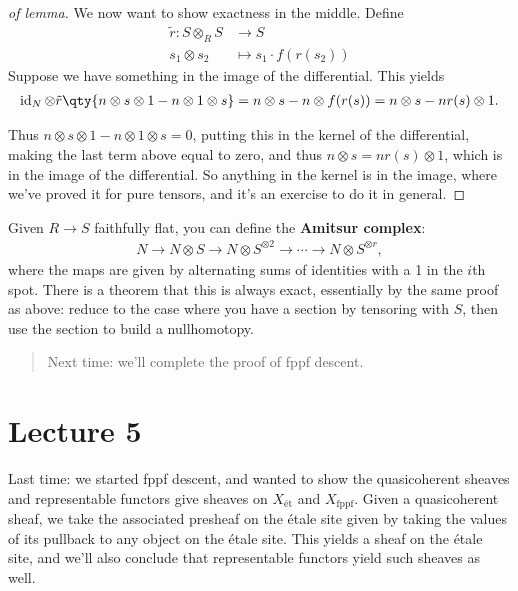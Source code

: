 \begin{proof}[of lemma]
We now want to show exactness in the middle. Define
\begin{align*}
\tilde r: S\otimes_R S &\to S \\
s_1 \otimes s_2 &\mapsto s_1 \cdot f(r(s_2))
\end{align*}
Suppose we have something in the image of the differential. This yields
\begin{align*}  
\operatorname{id}_N \otimes\tilde r \qty{n\otimes s\otimes 1 - n\otimes 1 \otimes s}
= n\otimes s - n\otimes f(r(s))
= n\otimes s - nr(s) \otimes 1
.\end{align*}

Thus \(n\otimes s\otimes 1 - n\otimes 1\otimes s = 0\), putting this in
the kernel of the differential, making the last term above equal to
zero, and thus \(n\otimes s = n r(s) \otimes 1\), which is in the image
of the differential. So anything in the kernel is in the image, where
we've proved it for pure tensors, and it's an exercise to do it in
general.

\end{proof}

\begin{remark}

Given \(R\to S\) faithfully flat, you can define the \textbf{Amitsur
complex}:
\begin{align*}  
N \to N\otimes S \to N\otimes S^{\otimes 2} \to \cdots \to N\otimes S^{\otimes r}
,\end{align*}
where the maps are given by alternating sums of identities with a 1 in
the \(i\)th spot. There is a theorem that this is always exact,
essentially by the same proof as above: reduce to the case where you
have a section by tensoring with \(S\), then use the section to build a
nullhomotopy.

\end{remark}

\begin{quote}
Next time: we'll complete the proof of fppf descent.
\end{quote}

\hypertarget{lecture-5}{%
\section{Lecture 5}\label{lecture-5}}

Last time: we started fppf descent, and wanted to show the quasicoherent
sheaves and representable functors give sheaves on \(X_{\text{ét}}\) and
\(X_{\mathrm{\operatorname{fppf}}}\). Given a quasicoherent sheaf, we
take the associated presheaf on the étale site given by taking the
values of its pullback to any object on the étale site. This yields a
sheaf on the étale site, and we'll also conclude that representable
functors yield such sheaves as well.

